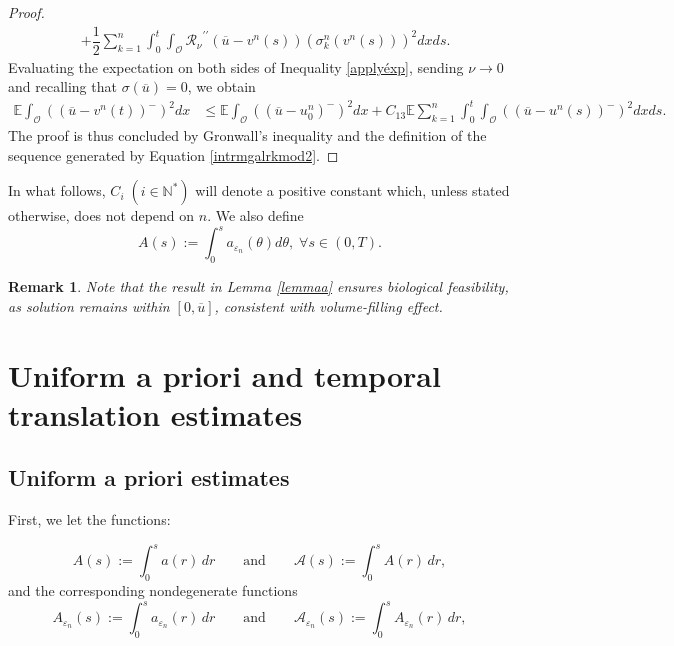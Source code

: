\documentclass[10pt,number,preprint,times]{elsarticle}
\numberwithin{equation}{section} %
\newtheorem{rem}{Remark}[section]
\begin{document}
\begin{proof}
\begin{align}
	&+\dfrac{1}{2} \sum_{k=1}^{n} \int_{0}^{t} \int_{\mathcal{O}} {\mathcal{R}_\nu}^{\prime \prime}(\overline{u}-v^n(s))  \left(\sigma_{k}^n(v^n(s))\right)^2 dx ds. 
\end{align}
Evaluating the expectation on both sides of Inequality \eqref{applyéxp}, sending $\nu \rightarrow 0$ and recalling that $\sigma(\overline{u})=0$,  we obtain
\begin{align}\label{itorégvrés}
	\mathbb{E} \int_\mathcal{O} \left(\left(\overline{u}-v^n(t)\right)^-\right)^2 dx&\leq \mathbb{E} \int_\mathcal{O} \left(\left(\overline{u}-u^n_0\right)^-\right)^2 dx+C_{13} \mathbb{E} \sum_{k=1}^{n} \int_{0}^{t} \int_{\mathcal{O}} \left(\left(\overline{u}-u^n(s)\right)^-\right)^2  dx ds. 
\end{align}
The proof is thus concluded by Gronwall's inequality and the definition of the sequence generated by Equation \eqref{intrmgalrkmod2}.
\end{proof}
In what follows, $C_i\; (i \in \mathbb{N}^*)$ will denote a positive constant which, unless stated otherwise, does not depend on $n$. We also define
\begin{equation}\label{défiA}
A(s):=\int_{0}^{s}  a_{\varepsilon_n}(\theta)d\theta,\;  \forall s \in (0,T).
\end{equation}

\begin{rem}
{Note that the result in Lemma \ref{lemmaa} ensures biological feasibility, as solution remains within $[0,\overline{u}]$, consistent with volume-filling effect.}
\end{rem}
\section{Uniform a priori and temporal translation estimates}\label{section4}
\subsection{Uniform a priori estimates}
First, we let the functions:

$$
A(s):=\int_0^s a(r)\,dr\qquad \text{and}\qquad \mathcal{A}(s):=\int_0^s A(r)\,dr,
$$
and the corresponding nondegenerate functions
$$
A_{\varepsilon_n}(s):=\int_0^s a_{\varepsilon_n}(r)\,dr\qquad \text{and}\qquad \mathcal{A}_{\varepsilon_n}(s):=\int_0^s A_{\varepsilon_n}(r)\,dr,
$$
\end{document}
